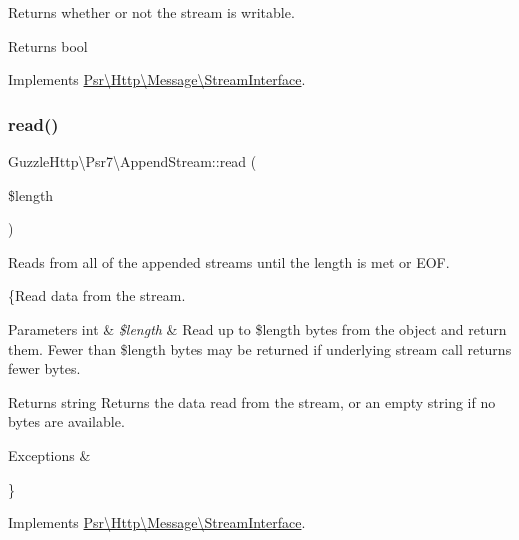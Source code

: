 Returns whether or not the stream is writable.

\begin{DoxyReturn}{Returns}
bool 
\end{DoxyReturn}


Implements \hyperlink{interfacePsr_1_1Http_1_1Message_1_1StreamInterface_a79287940d75d1951b831879fdc493883}{Psr\textbackslash{}\+Http\textbackslash{}\+Message\textbackslash{}\+Stream\+Interface}.

\mbox{\label{classGuzzleHttp_1_1Psr7_1_1AppendStream_a4f80293cfe091483f32343f55d411ef4}} 
\subsubsection{\texorpdfstring{read()}{read()}}
{\footnotesize\ttfamily Guzzle\+Http\textbackslash{}\+Psr7\textbackslash{}\+Append\+Stream\+::read (\begin{DoxyParamCaption}\item[{}]{\$length }\end{DoxyParamCaption})}

Reads from all of the appended streams until the length is met or E\+OF.

\{Read data from the stream.


\begin{DoxyParams}[1]{Parameters}
int & {\em \$length} & Read up to \$length bytes from the object and return them. Fewer than \$length bytes may be returned if underlying stream call returns fewer bytes. \\
\hline
\end{DoxyParams}
\begin{DoxyReturn}{Returns}
string Returns the data read from the stream, or an empty string if no bytes are available. 
\end{DoxyReturn}

\begin{DoxyExceptions}{Exceptions}
{\em } & \\
\hline
\end{DoxyExceptions}
\} 

Implements \hyperlink{interfacePsr_1_1Http_1_1Message_1_1StreamInterface_ad41b4afe827e179dfb4b988e98cccb12}{Psr\textbackslash{}\+Http\textbackslash{}\+Message\textbackslash{}\+Stream\+Interface}.

